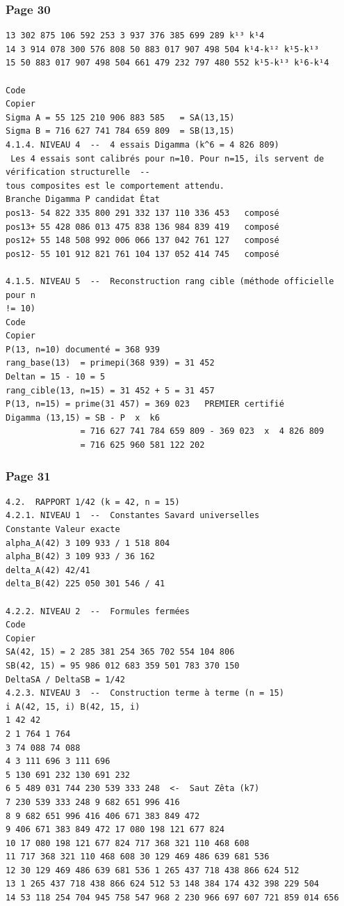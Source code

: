 \documentclass[11pt,a4paper]{article}
\begin{document}
\subsubsection*{Page 30}
\begin{Verbatim}[fontsize=\footnotesize]
13 302 875 106 592 253 3 937 376 385 699 289 k¹³ k¹4 
14 3 914 078 300 576 808 50 883 017 907 498 504 k¹4-k¹² k¹5-k¹³ 
15 50 883 017 907 498 504 661 479 232 797 480 552 k¹5-k¹³ k¹6-k¹4 
 
Code 
Copier 
Sigma A = 55 125 210 906 883 585   = SA(13,15) 
Sigma B = 716 627 741 784 659 809  = SB(13,15) 
4.1.4. NIVEAU 4  --  4 essais Digamma (k^6 = 4 826 809) 
 Les 4 essais sont calibrés pour n=10. Pour n=15, ils servent de vérification structurelle  --  
tous composites est le comportement attendu. 
Branche Digamma P candidat État 
pos13- 54 822 335 800 291 332 137 110 336 453   composé 
pos13+ 55 428 086 013 475 838 136 984 839 419   composé 
pos12+ 55 148 508 992 006 066 137 042 761 127   composé 
pos12- 55 101 912 821 761 104 137 052 414 745   composé 
 
4.1.5. NIVEAU 5  --  Reconstruction rang cible (méthode officielle pour n 
!= 10) 
Code 
Copier 
P(13, n=10) documenté = 368 939 
rang_base(13)  = primepi(368 939) = 31 452 
Deltan = 15 - 10 = 5 
rang_cible(13, n=15) = 31 452 + 5 = 31 457 
P(13, n=15) = prime(31 457) = 369 023   PREMIER certifié 
Digamma (13,15) = SB - P  x  k6 
               = 716 627 741 784 659 809 - 369 023  x  4 826 809 
               = 716 625 960 581 122 202 
\end{Verbatim}
\medskip
\subsubsection*{Page 31}
\begin{Verbatim}[fontsize=\footnotesize]
4.2.  RAPPORT 1/42 (k = 42, n = 15) 
4.2.1. NIVEAU 1  --  Constantes Savard universelles 
Constante Valeur exacte 
alpha_A(42) 3 109 933 / 1 518 804 
alpha_B(42) 3 109 933 / 36 162 
delta_A(42) 42/41 
delta_B(42) 225 050 301 546 / 41 
 
4.2.2. NIVEAU 2  --  Formules fermées 
Code 
Copier 
SA(42, 15) = 2 285 381 254 365 702 554 104 806 
SB(42, 15) = 95 986 012 683 359 501 783 370 150 
DeltaSA / DeltaSB = 1/42   
4.2.3. NIVEAU 3  --  Construction terme à terme (n = 15) 
i A(42, 15, i) B(42, 15, i) 
1 42 42 
2 1 764 1 764 
3 74 088 74 088 
4 3 111 696 3 111 696 
5 130 691 232 130 691 232 
6 5 489 031 744 230 539 333 248  <-  Saut Zêta (k7) 
7 230 539 333 248 9 682 651 996 416 
8 9 682 651 996 416 406 671 383 849 472 
9 406 671 383 849 472 17 080 198 121 677 824 
10 17 080 198 121 677 824 717 368 321 110 468 608 
11 717 368 321 110 468 608 30 129 469 486 639 681 536 
12 30 129 469 486 639 681 536 1 265 437 718 438 866 624 512 
13 1 265 437 718 438 866 624 512 53 148 384 174 432 398 229 504 
14 53 118 254 704 945 758 547 968 2 230 966 697 607 721 859 014 656 
\end{Verbatim}
\medskip
\end{document}
